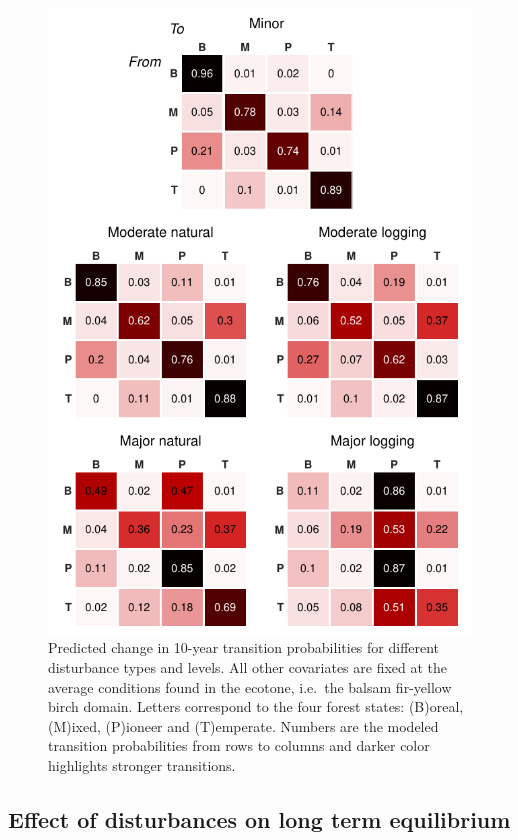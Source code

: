 \documentclass[a4paperpaper,]{article}
\begin{document}
\begin{figure}
\centering
\includegraphics{res/fig5_pmatrix.pdf}
\caption{Predicted change in 10-year transition probabilities for
different disturbance types and levels. All other covariates are fixed
at the average conditions found in the ecotone, i.e.~the balsam
fir-yellow birch domain. Letters correspond to the four forest states:
(B)oreal, (M)ixed, (P)ioneer and (T)emperate. Numbers are the modeled
transition probabilities from rows to columns and darker color
highlights stronger transitions.}
\end{figure}

\pagebreak

\hypertarget{effect-of-disturbances-on-long-term-equilibrium}{%
\subsection{Effect of disturbances on long term
equilibrium}\label{effect-of-disturbances-on-long-term-equilibrium}}
\end{document}
